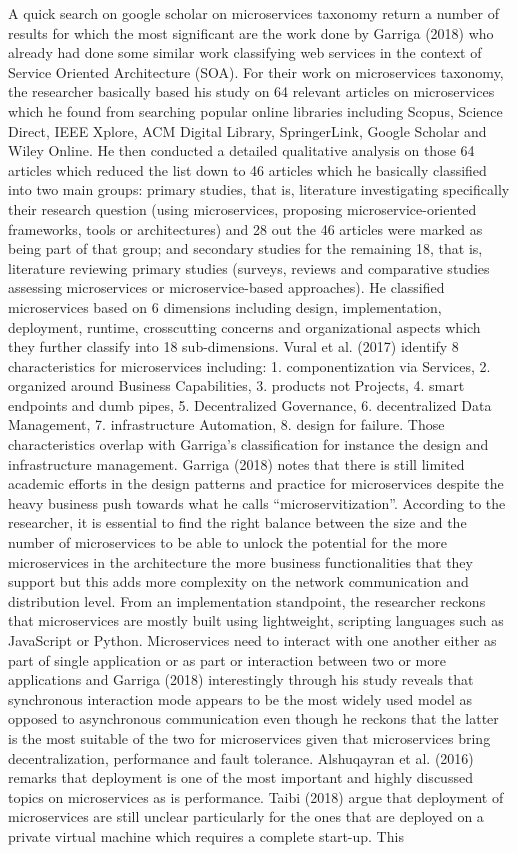 \documentclass{article}
\begin{document}
A quick search on google scholar on microservices taxonomy return a number of results for which the most significant are the work done by Garriga (2018) who already had done some similar work classifying web services in the context of Service Oriented Architecture (SOA). For their work on microservices taxonomy, the researcher basically based his study on 64 relevant articles on microservices which he found from searching popular online libraries including Scopus, Science Direct, IEEE Xplore, ACM Digital Library, SpringerLink, Google Scholar and Wiley Online. He then conducted a detailed qualitative analysis on those 64 articles which reduced the list down to 46 articles which he basically classified into two main groups: primary studies, that is, literature investigating specifically their research question (using microservices, proposing microservice-oriented frameworks, tools or architectures) and 28 out the 46 articles were marked as being part of that group; and secondary studies for the remaining 18, that is, literature reviewing primary studies (surveys, reviews and comparative studies assessing microservices or microservice-based approaches). He classified microservices based on 6 dimensions including design, implementation, deployment, runtime, crosscutting concerns and organizational aspects which they further classify into 18 sub-dimensions. Vural et al. (2017) identify 8 characteristics for microservices including: 1. componentization via Services, 2. organized around Business Capabilities, 3. products not Projects, 4. smart endpoints and dumb pipes, 5. Decentralized Governance, 6. decentralized Data Management, 7. infrastructure Automation, 8. design for failure. Those characteristics overlap with Garriga’s classification for instance the design and infrastructure management. Garriga (2018) notes that there is still limited academic efforts in the design patterns and practice for microservices despite the heavy business push towards what he calls “microservitization”. According to the researcher, it is essential to find the right balance between the size and the number of microservices to be able to unlock the potential for the more microservices in the architecture the more business functionalities that they support but this adds more complexity on the network communication and distribution level. From an implementation standpoint, the researcher reckons that microservices are mostly built using lightweight, scripting languages such as JavaScript or Python. Microservices need to interact with one another either as part of single application or as part or interaction between two or more applications and Garriga (2018) interestingly through his study reveals that synchronous interaction mode appears to be the most widely used model as opposed to asynchronous communication even though he reckons that the latter is the most suitable of the two for microservices given that microservices bring decentralization, performance and fault tolerance. Alshuqayran et al. (2016) remarks that deployment is one of the most important and highly discussed topics on microservices as is performance. Taibi (2018) argue that deployment of microservices are still unclear particularly for the ones that are deployed on a private virtual machine which requires a complete start-up. This 
\end{document}
